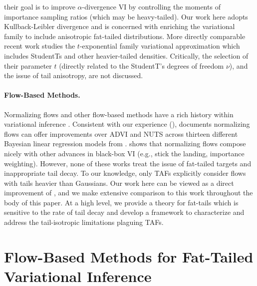 \documentclass[../../thesis.tex]{subfiles}
\begin{document}
their goal is to improve $\alpha$-divergence VI by controlling the moments of importance
sampling ratios (which may be heavy-tailed). Our work here adopts
Kullback-Leibler divergence and is concerned with enriching the variational family
to include anisotropic fat-tailed distributions.
More directly comparable recent work \citep{ding2011t,futami2017expectation} studies the $t$-exponential family
variational approximation which includes StudentTs and other
heavier-tailed densities. Critically, the selection of their parameter $t$ (directly related to the
StudentT's degrees of freedom $\nu$), and the issue of tail anisotropy, are not discussed. %

\paragraph{Flow-Based Methods.}

Normalizing flows and other flow-based methods have a rich history within variational
inference \citep{kingma2016improved,rezende2015variational,agrawal2020advances,webb2019improving}.
Consistent with our experience (), \citet{webb2019improving}
documents normalizing flows can offer improvements over ADVI and NUTS across thirteen different
Bayesian linear regression models from \citet{gelman2006data}.
\citet{agrawal2020advances} shows that normalizing flows compose nicely with other
advances in black-box VI (e.g., stick the landing, importance weighting).
However, none of these works treat the issue of fat-tailed targets and inappropriate tail
decay.
To our knowledge, only TAFs \citep{jaini2020tails} explicitly consider flows with tails
heavier than Gaussians. Our work here can be viewed as a direct improvement of \citet{jaini2020tails},
and we make extensive comparison to this work throughout the body of this paper. At
a high level, we provide a theory for fat-tails which is sensitive to the rate of
tail decay and develop a framework to characterize and address the tail-isotropic limitations plaguing
TAFs.

\section{Flow-Based Methods for Fat-Tailed Variational Inference}

\end{document}
